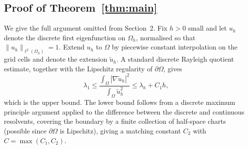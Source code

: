 \documentclass[journal=gmj]{CUP-JNL-DTM}
\theoremstyle{definition}
\begin{document}
\begin{appendix}
\section{Proof of Theorem~\ref{thm:main}}
\label{appendixA}

We give the full argument omitted from Section~2. Fix $h > 0$ small and let
$u_h$ denote the discrete first eigenfunction on $\Omega_h$, normalised so
that $\|u_h\|_{\ell^2(\Omega_h)} = 1$. Extend $u_h$ to $\Omega$ by piecewise
constant interpolation on the grid cells and denote the extension
$\tilde{u}_h$. A standard discrete Rayleigh quotient estimate, together with
the Lipschitz regularity of $\partial\Omega$, gives
\[
  \lambda_1 \le \frac{\int_\Omega |\nabla \tilde{u}_h|^2}{\int_\Omega \tilde{u}_h^2} \le \lambda_h + C_1 h,
\]
which is the upper bound. The lower bound follows from a discrete maximum
principle argument applied to the difference between the discrete and
continuous resolvents, covering the boundary by a finite collection of
half-space charts (possible since $\partial\Omega$ is Lipschitz), giving a
matching constant $C_2$ with $C = \max(C_1, C_2)$.
\end{appendix}
\end{document}
